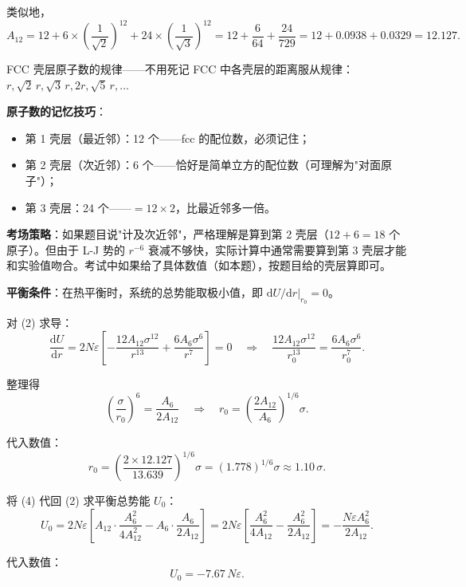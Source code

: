 类似地，
\[
  A_{12} = 12 + 6\times\left(\frac{1}{\sqrt{2}}\right)^{12} + 24\times\left(\frac{1}{\sqrt{3}}\right)^{12}
         = 12 + \frac{6}{64} + \frac{24}{729}
         = 12 + 0.0938 + 0.0329
         = 12.127 .
\]

\begin{insightbox}{FCC 壳层原子数的规律——不用死记}
FCC 中各壳层的距离服从规律：$r, \sqrt{2}\,r, \sqrt{3}\,r, 2r, \sqrt{5}\,r, \dots$

\textbf{原子数的记忆技巧}：
\begin{itemize}[nosep]
  \item 第 1 壳层（最近邻）：12 个——fcc 的配位数，必须记住；
  \item 第 2 壳层（次近邻）：6 个——恰好是简单立方的配位数（可理解为"对面原子"）；
  \item 第 3 壳层：24 个——$= 12\times 2$，比最近邻多一倍。
\end{itemize}

\textbf{考场策略}：如果题目说"计及次近邻"，严格理解是算到第 2 壳层（$12+6=18$ 个原子）。但由于 L-J 势的 $r^{-6}$ 衰减不够快，实际计算中通常需要算到第 3 壳层才能和实验值吻合。考试中如果给了具体数值（如本题），按题目给的壳层算即可。
\end{insightbox}

\textbf{平衡条件}：在热平衡时，系统的总势能取极小值，即 $\mathrm{d}U/\mathrm{d}r|_{r_0} = 0$。

对 (2) 求导：
\[
  \frac{\mathrm{d}U}{\mathrm{d}r} = 2N\varepsilon\left[-\frac{12A_{12}\sigma^{12}}{r^{13}} + \frac{6A_6\sigma^6}{r^7}\right] = 0
  \quad\Longrightarrow\quad
  \frac{12A_{12}\sigma^{12}}{r_0^{13}} = \frac{6A_6\sigma^6}{r_0^7} .
\]

整理得
\[
  \left(\frac{\sigma}{r_0}\right)^6 = \frac{A_6}{2A_{12}}
  \quad\Longrightarrow\quad
  \boxed{r_0 = \left(\frac{2A_{12}}{A_6}\right)^{1/6}\sigma} .
\tag{4}
\]

代入数值：
\[
  r_0 = \left(\frac{2\times 12.127}{13.639}\right)^{1/6}\sigma
      = (1.778)^{1/6}\sigma
      \approx 1.10\,\sigma .
\]

将 (4) 代回 (2) 求平衡总势能 $U_0$：
\[
  U_0 = 2N\varepsilon\left[A_{12}\cdot\frac{A_6^2}{4A_{12}^2} - A_6\cdot\frac{A_6}{2A_{12}}\right]
      = 2N\varepsilon\left[\frac{A_6^2}{4A_{12}} - \frac{A_6^2}{2A_{12}}\right]
      = -\frac{N\varepsilon A_6^2}{2A_{12}} .
\]

代入数值：
\[
  \boxed{U_0 = -7.67\,N\varepsilon} .
\tag{5}
\]

